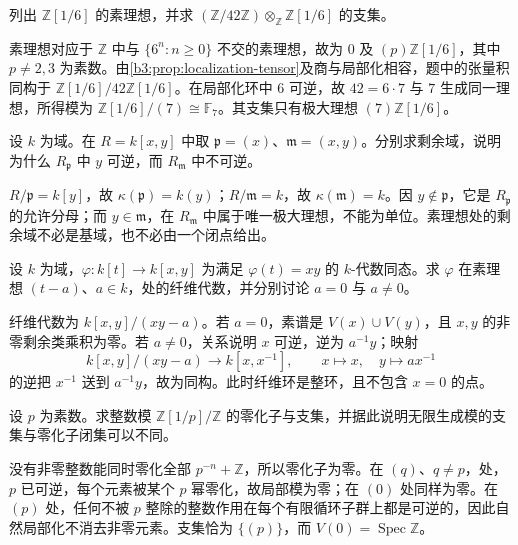 \begin{exercise}\label{b3:ex:02-primes-invert-six}
	列出 \(\mathbb Z[1/6]\) 的素理想，并求 \((\mathbb Z/42\mathbb Z)\otimes_{\mathbb Z}\mathbb Z[1/6]\) 的支集。
\end{exercise}
\begin{solution}
	素理想对应于 \(\mathbb Z\) 中与 \(\{6^n:n\ge0\}\) 不交的素理想，故为 \(0\) 及 \((p)\mathbb Z[1/6]\)，其中 \(p\ne2,3\) 为素数。由\cref{b3:prop:localization-tensor}及商与局部化相容，题中的张量积同构于 \(\mathbb Z[1/6]/42\mathbb Z[1/6]\)。在局部化环中 \(6\) 可逆，故 \(42=6\cdot7\) 与 \(7\) 生成同一理想，所得模为 \(\mathbb Z[1/6]/(7)\cong\mathbb F_7\)。其支集只有极大理想 \((7)\mathbb Z[1/6]\)。
\end{solution}

\begin{exercise}\label{b3:ex:02-residue-generic}
	设 \(k\) 为域。在 \(R=k[x,y]\) 中取 \(\mathfrak p=(x)\)、\(\mathfrak m=(x,y)\)。分别求剩余域，说明为什么 \(R_{\mathfrak p}\) 中 \(y\) 可逆，而 \(R_{\mathfrak m}\) 中不可逆。
\end{exercise}
\begin{solution}
	\(R/\mathfrak p=k[y]\)，故 \(\kappa(\mathfrak p)=k(y)\)；\(R/\mathfrak m=k\)，故 \(\kappa(\mathfrak m)=k\)。因 \(y\notin\mathfrak p\)，它是 \(R_{\mathfrak p}\) 的允许分母；而 \(y\in\mathfrak m\)，在 \(R_{\mathfrak m}\) 中属于唯一极大理想，不能为单位。素理想处的剩余域不必是基域，也不必由一个闭点给出。
\end{solution}

\begin{exercise}\label{b3:ex:02-hyperbola-fibres}
	设 \(k\) 为域，\(\varphi:k[t]\rightarrow k[x,y]\) 为满足 \(\varphi(t)=xy\) 的 \(k\)-代数同态。求 \(\varphi\) 在素理想 \((t-a)\)、\(a\in k\)，处的纤维代数，并分别讨论 \(a=0\) 与 \(a\ne0\)。
\end{exercise}
\begin{solution}
	纤维代数为 \(k[x,y]/(xy-a)\)。若 \(a=0\)，素谱是 \(V(x)\cup V(y)\)，且 \(x,y\) 的非零剩余类乘积为零。若 \(a\ne0\)，关系说明 \(x\) 可逆，逆为 \(a^{-1}y\)；映射
	\[
		k[x,y]/(xy-a)\longrightarrow k[x,x^{-1}],\qquad x\longmapsto x,\quad y\longmapsto ax^{-1}
	\]
	的逆把 \(x^{-1}\) 送到 \(a^{-1}y\)，故为同构。此时纤维环是整环，且不包含 \(x=0\) 的点。
\end{solution}

\begin{exercise}\label{b3:ex:02-prufer-support}
	设 \(p\) 为素数。求整数模 \(\mathbb Z[1/p]/\mathbb Z\) 的零化子与支集，并据此说明无限生成模的支集与零化子闭集可以不同。
\end{exercise}
\begin{solution}
	没有非零整数能同时零化全部 \(p^{-n}+\mathbb Z\)，所以零化子为零。在 \((q)\)、\(q\ne p\)，处，\(p\) 已可逆，每个元素被某个 \(p\) 幂零化，故局部模为零；在 \((0)\) 处同样为零。在 \((p)\) 处，任何不被 \(p\) 整除的整数作用在每个有限循环子群上都是可逆的，因此自然局部化不消去非零元素。支集恰为 \(\bigl\{(p)\bigr\}\)，而 \(V(0)=\operatorname{Spec}\mathbb Z\)。
\end{solution}

